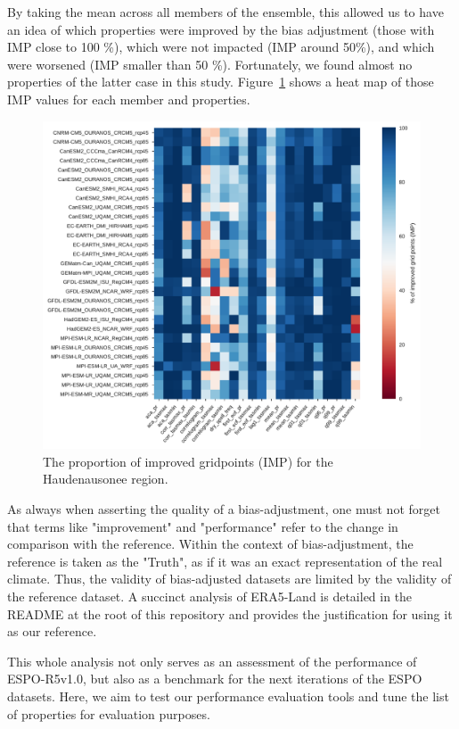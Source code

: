 \documentclass[letterpaper,10pt]{article}
\begin{document}
By taking the mean across all members of the ensemble, this allowed us to have an idea of which properties were improved by the bias adjustment (those with IMP close to 100 \%), which were not impacted (IMP around 50\%), and which were worsened (IMP smaller than 50 \%).
Fortunately, we found almost no properties of the latter case in this study. Figure~\ref{fig:imp} shows a heat map of those IMP values for each member and properties.

\begin{figure}
    \centering
    \includegraphics[width=\textwidth]{../images/overall_improvement.pdf}
    \caption{The proportion of improved gridpoints (IMP) for the Haudenausonee region.}\label{fig:imp}
\end{figure}

As always when asserting the quality of a bias-adjustment, one must not forget that terms like "improvement" and "performance" refer to the change in comparison with the reference.
Within the context of bias-adjustment, the reference is taken as the "Truth", as if it was an exact representation of the real climate.
Thus, the validity of bias-adjusted datasets are limited by the validity of the reference dataset.
A succinct analysis of ERA5-Land is detailed in the README at the root of this repository and provides the justification for using it as our reference.

This whole analysis not only serves as an assessment of the performance of ESPO-R5v1.0, but also as a benchmark for the next iterations of the ESPO datasets.
Here, we aim to test our performance evaluation tools and tune the list of properties for evaluation purposes.
\end{document}

